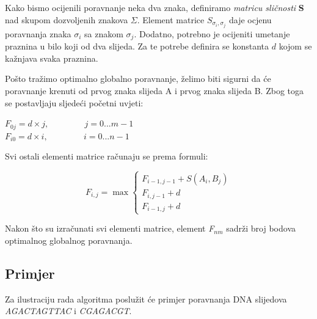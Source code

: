 \documentclass[times, utf8, zavrsni, numeric]{fer}
\begin{document}
Kako bismo ocijenili poravnanje neka dva znaka, definiramo \textit{matricu sličnosti} \textbf{S} nad skupom dozvoljenih znakova $\Sigma$. Element matrice $S_{\sigma_{i}, \sigma_{j}}$ daje ocjenu poravnanja znaka $\sigma_{i}$ sa znakom $\sigma_{j}$. Dodatno, potrebno je ocijeniti umetanje praznina u bilo koji od dva slijeda. Za te potrebe definira se konstanta $d$ kojom se kažnjava svaka praznina.

Pošto tražimo optimalno globalno poravnanje, želimo biti sigurni da će poravnanje krenuti od prvog znaka slijeda A i prvog znaka slijeda B. Zbog toga se postavljaju sljedeći početni uvjeti:
\begin{center}
$F_{0j} = d \times j,\hspace{50pt} j = 0...m - 1$\\
$F_{i0} = d \times i,\hspace{50pt} i = 0...n - 1$
\end{center}
Svi ostali elementi matrice računaju se prema formuli:
\begin{center}
\begin{equation}
F_{i, j} = \max \left\{
	\begin{array}{lr}
		F_{i-1,j-1} + S(A_{i}, B_{j}) \\
		F_{i, j-1} + d \\
		F_{i-1, j} + d
	\end{array}
\right.
\end{equation}
\end{center}

Nakon što su izračunati svi elementi matrice, element \textit{F$_{nm}$} sadrži broj bodova optimalnog globalnog poravnanja.

\subsection{Primjer}
\indent

Za ilustraciju rada algoritma poslužit će primjer poravnanja DNA slijedova \emph{AGACTAGTTAC} i \emph{CGAGACGT}.
\end{document}
